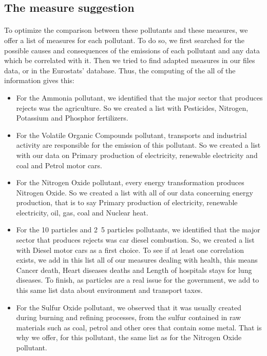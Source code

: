 \documentclass[preprint,journal]{vgtc}       %
\begin{document}
	\subsection{The measure suggestion}
	\paragraph{}
	To optimize the comparison between these pollutants and these measures, we offer a list of measures for each pollutant. To do so, we first searched for the possible causes and consequences of the emissions of each pollutant and any data which be correlated with it. Then we tried to find adapted measures in our files data, or in the Eurostats’ database.
\newline
Thus, the computing of the all of the information gives this:	
\begin{itemize}[leftmargin=*,parsep=0cm]
	\item For the Ammonia pollutant, we identified that the major sector that produces rejects was the agriculture. So we created a list with Pesticides, Nitrogen, Potassium and Phosphor fertilizers.
	\item For the Volatile Organic Compounds pollutant, transports and industrial activity are responsible for the emission of this pollutant. So we created a list with our data on Primary production of electricity, renewable electricity and coal and Petrol motor cars.
	\item For the Nitrogen Oxide pollutant, every energy transformation produces Nitrogen Oxide. So we created a list with all of our data concerning energy production, that is to say Primary production of electricity, renewable electricity, oil, gas, coal and Nuclear heat.
	\item For the \unit{10}{\micro\meter} particles and \unit{2.5}{\micro\meter} particles pollutants, we identified that the major sector that produces rejects was car diesel combustion. So, we created a list with Diesel motor cars as a first choice. To see if at least one correlation exists, we add in this list all of our measures dealing with health, this means Cancer death, Heart diseases deaths and Length of hospitals stays for lung diseases. To finish, as particles are a real issue for the government, we add to this same list data about environment and transport taxes.
	\item For the Sulfur Oxide pollutant, we observed that it was usually created during burning and refining processes, from the sulfur contained in raw materials such as coal, petrol and other ores that contain some metal. That is why we offer, for this pollutant, the same list as for the Nitrogen Oxide pollutant.
\end{itemize}
\end{document}
